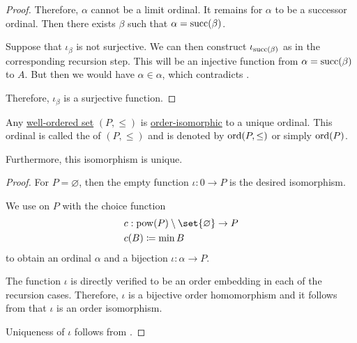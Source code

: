 \begin{proof}
  Therefore, \( \alpha \) cannot be a limit ordinal. It remains for \( \alpha \) to be a successor ordinal. Then there exists \( \beta \) such that \( \alpha = \operatorname{succ}(\beta) \).

  Suppose that \( \iota_\beta \) is not surjective. We can then construct \( \iota_{\operatorname{succ}(\beta)} \) as in the corresponding recursion step. This will be an injective function from \( \alpha = \operatorname{succ}(\beta) \) to \( A \). But then we would have \( \alpha \in \alpha \), which contradicts .

  Therefore, \( \iota_\beta \) is a surjective function.
\end{proof}

\begin{theorem}\label{thm:well_ordered_order_type_existence}
  Any \hyperref[def:well_ordered_set]{well-ordered set} \( (P, \leq) \) is \hyperref[def:partially_ordered_set/homomorphism]{order-isomorphic} to a unique ordinal. This ordinal is called the  of \( (P, \leq) \) and is denoted by \( \operatorname{ord}(P, \leq) \) or simply \( \operatorname{ord}(P) \).

  Furthermore, this isomorphism is unique.
\end{theorem}
\begin{proof}
  For \( P = \varnothing \), then the empty function \( \iota: 0 \to P \) is the desired isomorphism.

  We use  on \( P \) with the choice function
  \begin{equation*}
    \begin{aligned}
      &c: \pow(P) \setminus \set{ \varnothing } \to P \\
      &c(B) \coloneqq \min B
    \end{aligned}
  \end{equation*}
  to obtain an ordinal \( \alpha \) and a bijection \( \iota: \alpha \to P \).

  The function \( \iota \) is directly verified to be an order embedding in each of the recursion cases. Therefore, \( \iota \) is a bijective order homomorphism and it follows from  that \( \iota \) is an order isomorphism.

  Uniqueness of \( \iota \) follows from .
\end{proof}

